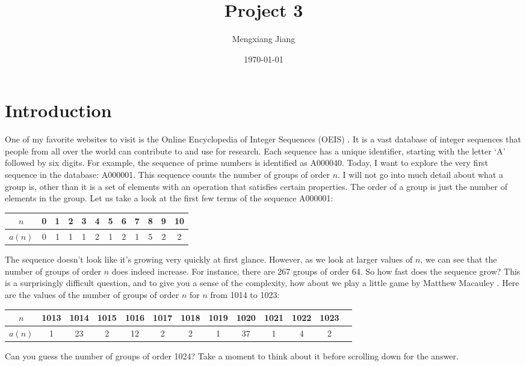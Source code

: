 \documentclass{article}
\title{Project 3}
\author{Mengxiang Jiang}
\date{\today}
\begin{document}
\maketitle

\section{Introduction}
One of my favorite websites to visit is the Online Encyclopedia of 
Integer Sequences (OEIS) \cite{sloane2003line}. It is a vast database 
of integer sequences that people from all over the world can contribute 
to and use for research. Each sequence has a unique identifier, 
starting with the letter `A' followed by six digits. For example, 
the sequence of prime numbers is identified as A000040. Today, I want to 
explore the very first sequence in the database: A000001. 
This sequence counts the number of groups of order $n$. 
I will not go into much detail about what a group is, other 
than it is a set of elements with an operation that satisfies 
certain properties. The order of a group is just the number 
of elements in the group. Let us take a look at the first few 
terms of the sequence A000001:
\begin{center}
\begin{tabular}{|c|c|c|c|c|c|c|c|c|c|c|c|}
\hline
$n$ & 0 & 1 & 2 & 3 & 4 & 5 & 6 & 7 & 8 & 9 & 10 \\
\hline
$a(n)$ & 0 & 1 & 1 & 1 & 2 & 1 & 2 & 1 & 5 & 2 & 2 \\
\hline
\end{tabular}
\end{center}
The sequence doesn't look like it's growing very quickly 
at first glance. However, as we look at larger values of $n$, 
we can see that the number of groups of order $n$ does 
indeed increase. For instance, there are 267 groups of order 64. 
So how fast does the sequence grow? This is a surprisingly 
difficult question, and to give you a sense of the complexity, 
how about we play a little game by Matthew Macauley \cite{macauley_2025}. 
Here are the values of the number of groups of order $n$ for $n$ 
from 1014 to 1023:
\begin{center}
\begin{tabular}{|c|c|c|c|c|c|c|c|c|c|c|c|c|}
\hline
$n$ & 1013 & 1014 & 1015 & 1016 & 1017 & 1018 & 1019 
& 1020 & 1021 & 1022 & 1023 \\
\hline
$a(n)$ & 1 & 23 & 2 & 12 & 2 & 2 & 1 & 37 & 1 & 4 & 2\\
\hline
\end{tabular}
\end{center}
Can you guess the number of groups of order 1024? 
Take a moment to think about it before scrolling down for the answer.
\end{document}

